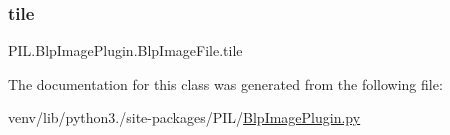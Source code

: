 \mbox{\label{classPIL_1_1BlpImagePlugin_1_1BlpImageFile_aa8f837065336803fa6d607d3e12e44ed}} 
\subsubsection{\texorpdfstring{tile}{tile}}
{\footnotesize\ttfamily P\+I\+L.\+Blp\+Image\+Plugin.\+Blp\+Image\+File.\+tile}



The documentation for this class was generated from the following file\+:\begin{DoxyCompactItemize}
\item 
venv/lib/python3./site-\/packages/\+P\+I\+L/\hyperlink{BlpImagePlugin_8py}{Blp\+Image\+Plugin.\+py}\end{DoxyCompactItemize}
